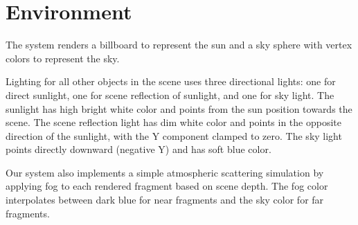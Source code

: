 \section{Environment} \label{sec:env} %

The system renders a billboard to represent the sun and a sky sphere with vertex colors to represent the sky.

Lighting for all other objects in the scene uses three directional lights: one for direct sunlight, one for scene reflection of sunlight, and one for sky light.
The sunlight has high bright white color and points from the sun position towards the scene.
The scene reflection light has dim white color and points in the opposite direction of the sunlight, with the Y component clamped to zero.
The sky light points directly downward (negative Y) and has soft blue color.

Our system also implements a simple atmospheric scattering simulation by applying fog to each rendered fragment based on scene depth.
The fog color interpolates between dark blue for near fragments and the sky color for far fragments.
